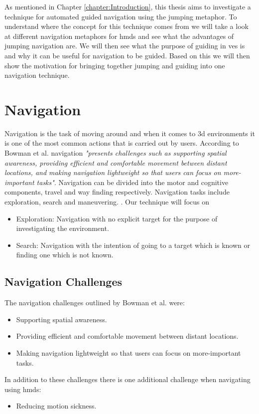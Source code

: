 \label{chapter:Related Work}
As mentioned in Chapter \ref{chapter:Introduction}, this thesis aims to investigate a technique for automated guided navigation using the jumping metaphor. To understand where the concept for this technique comes from we will take a look at different navigation metaphors for \acrshort{hmd}s and see what the advantages of jumping navigation are. We will then see what the purpose of guiding in \acrshort{ve}s is and why it can be useful for navigation to be guided. Based on this we will then show the motivation for bringing together jumping and guiding into one navigation technique. 

\section{Navigation}
\label{section:RW Navigation}

Navigation is the task of moving around and when it comes to \acrfull{3d} environments it is one of the most common actions that is carried out by users. According to Bowman et al. navigation \textit{"presents challenges such as supporting spatial awareness, providing efficient and comfortable movement between distant locations, and making navigation lightweight so that users can focus on more-important tasks"}. Navigation can be divided into the motor and cognitive components, travel and way finding respectively. Navigation tasks include exploration, search and maneuvering. \cite{Bowman2001}. Our technique will focus on 
\begin{itemize}
	\item Exploration: Navigation with no explicit target for the purpose of investigating the environment.
	\item Search: Navigation with the intention of going to a target which is known or finding one which is not known.
\end{itemize}

\subsection{Navigation Challenges}
\label{subsection RW Navigation:Navigation Challenges}
The navigation challenges outlined by Bowman et al. were:
\begin{itemize}
	\item Supporting spatial awareness.
	\item Providing efficient and comfortable movement between distant locations.
	\item Making navigation lightweight so that users can focus on more-important tasks.
\end{itemize}
In addition to these challenges there is one additional challenge when navigating using \acrshort{hmd}s:
\begin{itemize}
	\item Reducing motion sickness. 
\end{itemize}

